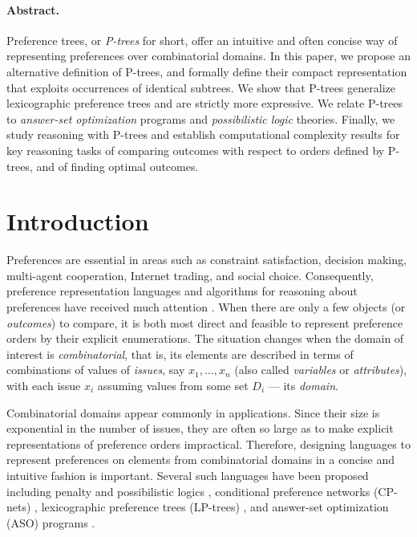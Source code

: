 \paragraph{\bf Abstract.}
Preference trees, or \emph{P-trees} for short, offer an intuitive and
often concise way of representing preferences over combinatorial domains. 
In this paper, we propose an alternative definition of P-trees, and 
formally define their compact representation that exploits occurrences 
of identical subtrees. We show that P-trees generalize lexicographic 
preference trees and are strictly more expressive. We relate P-trees 
to \textit{answer-set optimization} programs and \textit{possibilistic 
logic} theories. Finally, we study reasoning with P-trees and 
establish computational complexity results for key reasoning tasks
of comparing outcomes with respect to orders defined by P-trees, and 
of finding optimal outcomes.

\section{Introduction}
Preferences are essential in areas such as constraint satisfaction, 
decision making, multi-agent cooperation, Internet trading, and social
choice. Consequently, preference representation languages and algorithms 
for reasoning about preferences have received much 
attention \cite{Kaci:Pref}. When there 
are only a few objects (or \textit{outcomes}) to compare, it is both most 
direct and feasible to represent preference orders by their explicit 
enumerations. The situation changes when the domain of interest is 
\emph{combinatorial}, that is, its elements are described in terms of 
combinations of values of \emph{issues}, say $x_1,\ldots, x_n$ (also 
called \emph{variables} or \emph{attributes}), with each issue $x_i$ 
assuming values from some set $D_i$ --- its \emph{domain}. 

Combinatorial domains appear commonly in applications. Since their 
size is exponential in the number of issues, they are often so large 
as to make explicit representations of preference orders impractical. 
Therefore, designing languages to represent preferences on elements 
from combinatorial domains in a concise and intuitive fashion is 
important. Several such languages have been proposed including penalty 
and possibilistic logics \cite{DuboisLP91}, conditional preference
networks (CP-nets) \cite{bbdh03}, lexicographic preference trees 
(LP-trees) \cite{booth:learningLP}, and answer-set optimization 
(ASO) programs \cite{Brewka:ASO}. 

